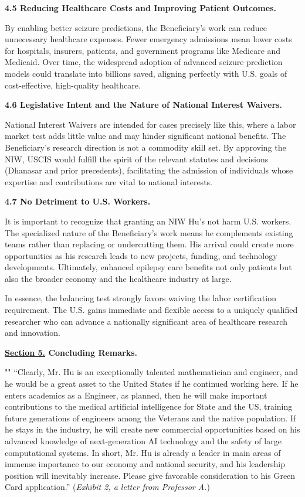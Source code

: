 \documentclass{article}
\begin{document}
{\bf 4.5 Reducing Healthcare Costs and Improving Patient Outcomes.}

By enabling better seizure predictions, the Beneficiary’s work can reduce unnecessary healthcare expenses. Fewer emergency admissions mean lower costs for hospitals, insurers, patients, and government programs like Medicare and Medicaid. Over time, the widespread adoption of advanced seizure prediction models could translate into billions saved, aligning perfectly with U.S. goals of cost-effective, high-quality healthcare.


{\bf 4.6 Legislative Intent and the Nature of National Interest Waivers.}

National Interest Waivers are intended for cases precisely like this, where a labor market test adds little value and may hinder significant national benefits. The Beneficiary’s research direction is not a commodity skill set. By approving the NIW, USCIS would fulfill the spirit of the relevant statutes and decisions (Dhanasar and prior precedents), facilitating the admission of individuals whose expertise and contributions are vital to national interests.

{\bf 4.7 No Detriment to U.S. Workers.}

It is important to recognize that granting an NIW Hu's not harm U.S. workers. The specialized nature of the Beneficiary’s work means he complements existing teams rather than replacing or undercutting them. His arrival could create more opportunities as his research leads to new projects, funding, and technology developments. Ultimately, enhanced epilepsy care benefits not only patients but also the broader economy and the healthcare industry at large.

In essence, the balancing test strongly favors waiving the labor certification requirement. The U.S. gains immediate and flexible access to a uniquely qualified researcher who can advance a nationally significant area of healthcare research and innovation.

\clearpage

{\bf \underline{Section 5.} Concluding Remarks. }

""
“Clearly, Mr. Hu is an exceptionally talented mathematician and engineer, and he would be a great asset to the United States if he continued working here. If he enters academics as a Engineer, as planned, then he will make important contributions to the medical artificial intelligence for State and the US, training future generations of engineers among the Veterans and the native population. If he stays in the industry, he will create new commercial opportunities based on his advanced knowledge of next-generation AI technology and the safety of large computational systems. In short, Mr. Hu is already a leader in main areas of immense importance to our economy and national security, and his leadership position will inevitably increase. Please give favorable consideration to his Green Card application.” ({\it Exhibit 2, a letter from Professor A.}) 
\end{document}
